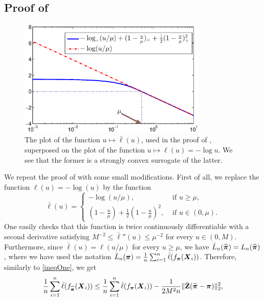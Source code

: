 \subsection{Proof of }
\label{ssec:proof:prop2}
\begin{figure}
	\begin{center}
		\includegraphics[width=0.8\textwidth]{./TeX_files/ell_and_ellbar.eps}
		\caption{The plot of the function $u\mapsto\bar\ell(u)$, used in the proof of
			, superposed on the plot of the function $u\mapsto\ell(u)=-\log u$.
			We see that the former is a strongly convex surrogate of the latter.}
		\label{fig:ell}
	\end{center}
\end{figure}
We repeat the proof of  with some small modifications. First of all, we replace the
function $\ell(u) = -\log(u)$ by the function
\begin{equation}\label{elBar}
\bar\ell(u) =
\begin{cases}
- \log(u/\mu), & \text{ if } u\ge \mu,\\
(1-\frac{u}{\mu})+\frac12(1-\frac{u}{\mu})^2, & \text{ if } u\in(0,\mu).
\end{cases}
\end{equation}
One easily checks that this function is twice continuously differentiable with a second
derivative satisfying $M^{-2}\le \bar\ell''(u)\le \mu^{-2}$ for every $u\in(0,M)$.
Furthermore, since $\bar\ell(u) = \ell(u/\mu)$ for every $u\ge \mu$, we have
$\bar L_n(\widehat{\boldsymbol \pi}) = L_n(\widehat{\boldsymbol \pi})$, where we have used the notation $\bar L_n(\boldsymbol \pi)
= \frac1n\sum_{i=1}^n \bar\ell(f_{\boldsymbol \pi}(\boldsymbol X_i))$. Therefore, similarly to \eqref{ineqOne},
we get
\begin{equation}\label{ineqOneb}
\frac{1}{n}\sum_{i=1}^n \bar\ell(f_{\widehat{\boldsymbol \pi}}(\boldsymbol X_i)) \leq
\frac{1}{n}\sum_{i=1}^n \bar\ell(f_{\boldsymbol \pi}(\boldsymbol X_i)) -
\frac{1}{2M^2n}\|\bar{\mathbf Z}(\widehat{\boldsymbol \pi}-\boldsymbol \pi)\|^2_2,
\end{equation}
